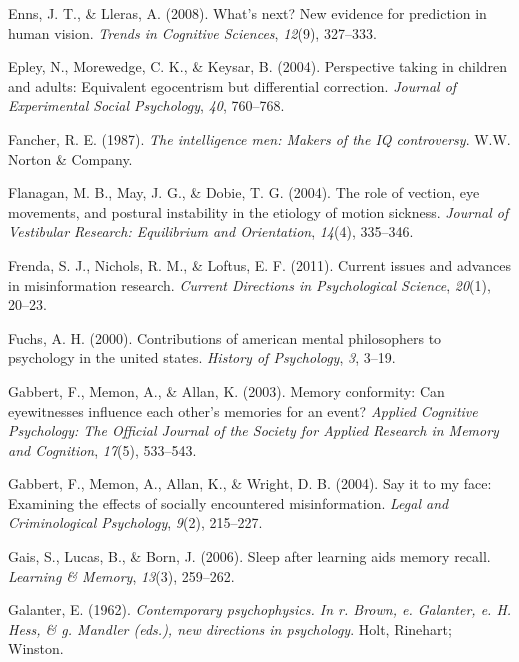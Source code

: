 \documentclass[
]{krantz}
\newlength{\cslhangindent}
\newenvironment{CSLReferences}[2] %
 {\begin{list}{}{%
  \setlength{\itemindent}{0pt}
  \setlength{\leftmargin}{0pt}
  \setlength{\parsep}{0pt}
  \ifodd #1
   \setlength{\leftmargin}{\cslhangindent}
   \setlength{\itemindent}{-1\cslhangindent}
  \fi
  \setlength{\itemsep}{#2\baselineskip}}}
 {\end{list}}
\begin{document}
\begin{CSLReferences}{1}{0}
Enns, J. T., \& Lleras, A. (2008). What's next? New evidence for prediction in human vision. \emph{Trends in Cognitive Sciences}, \emph{12}(9), 327--333.

Epley, N., Morewedge, C. K., \& Keysar, B. (2004). Perspective taking in children and adults: Equivalent egocentrism but differential correction. \emph{Journal of Experimental Social Psychology}, \emph{40}, 760--768.

Fancher, R. E. (1987). \emph{The intelligence men: Makers of the IQ controversy}. W.W. Norton \& Company.

Flanagan, M. B., May, J. G., \& Dobie, T. G. (2004). The role of vection, eye movements, and postural instability in the etiology of motion sickness. \emph{Journal of Vestibular Research: Equilibrium and Orientation}, \emph{14}(4), 335--346.

Frenda, S. J., Nichols, R. M., \& Loftus, E. F. (2011). Current issues and advances in misinformation research. \emph{Current Directions in Psychological Science}, \emph{20}(1), 20--23.

Fuchs, A. H. (2000). Contributions of american mental philosophers to psychology in the united states. \emph{History of Psychology}, \emph{3}, 3--19.

Gabbert, F., Memon, A., \& Allan, K. (2003). Memory conformity: Can eyewitnesses influence each other's memories for an event? \emph{Applied Cognitive Psychology: The Official Journal of the Society for Applied Research in Memory and Cognition}, \emph{17}(5), 533--543.

Gabbert, F., Memon, A., Allan, K., \& Wright, D. B. (2004). Say it to my face: Examining the effects of socially encountered misinformation. \emph{Legal and Criminological Psychology}, \emph{9}(2), 215--227.

Gais, S., Lucas, B., \& Born, J. (2006). Sleep after learning aids memory recall. \emph{Learning \& Memory}, \emph{13}(3), 259--262.

Galanter, E. (1962). \emph{Contemporary psychophysics. In r. Brown, e. Galanter, e. H. Hess, \& g. Mandler (eds.), new directions in psychology}. Holt, Rinehart; Winston.


\end{CSLReferences}
\end{document}
